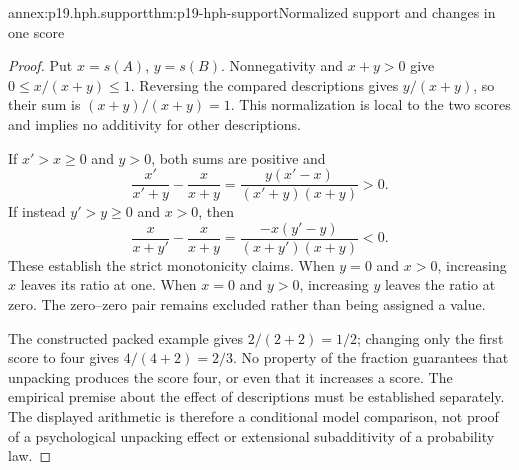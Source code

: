 \begin{annexitem}{annex:p19.hph.support}{thm:p19-hph-support}{Normalized support and changes in one score}
\begin{proof}
Put \(x=s(A)\), \(y=s(B)\). Nonnegativity and \(x+y>0\)
give \(0\leq x/(x+y)\leq1\). Reversing the compared descriptions
gives \(y/(x+y)\), so their sum is \((x+y)/(x+y)=1\).
This normalization is local to the two scores and implies no additivity
for other descriptions.

If \(x'>x\geq0\) and \(y>0\), both sums are positive and
\[
 \frac{x'}{x'+y}-\frac{x}{x+y}
   =\frac{y(x'-x)}{(x'+y)(x+y)}>0.
\]
If instead \(y'>y\geq0\) and \(x>0\), then
\[
 \frac{x}{x+y'}-\frac{x}{x+y}
   =\frac{-x(y'-y)}{(x+y')(x+y)}<0.
\]
These establish the strict monotonicity claims. When \(y=0\) and
\(x>0\), increasing \(x\) leaves its ratio at one. When \(x=0\)
and \(y>0\), increasing \(y\) leaves the ratio at zero. The
zero--zero pair remains excluded rather than being assigned a value.

The constructed packed example gives \(2/(2+2)=1/2\); changing
only the first score to four gives \(4/(4+2)=2/3\). No property of
the fraction guarantees that unpacking produces the score four, or
even that it increases a score. The empirical premise about the effect
of descriptions must be established separately. The displayed arithmetic
is therefore a conditional model comparison, not proof of a psychological
unpacking effect or extensional subadditivity of a probability law.
\end{proof}
\end{annexitem}
